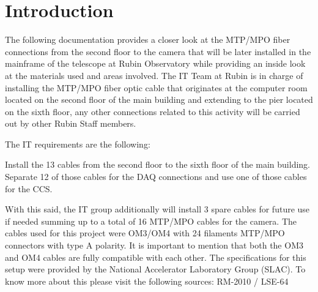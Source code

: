 \section{Introduction}

The following documentation provides a closer look at the MTP/MPO fiber connections from the second floor to the camera that will be later installed in the mainframe of the telescope at Rubin Observatory while providing an inside look at the materials used and areas involved. The IT Team at Rubin is in charge of installing the MTP/MPO fiber optic cable that originates at the computer room located on the second floor of the main building and extending to the pier located on the sixth floor, any other connections related to this activity will be carried out by other Rubin Staff members.



The IT requirements are the following:

Install the 13 cables from the second floor to the sixth floor of the main building.
Separate 12 of those cables for the DAQ connections and use one of those cables for the CCS.


With this said, the IT group additionally will install 3 spare cables for future use if needed summing up to a total of 16 MTP/MPO cables for the camera. The cables used for this project were OM3/OM4 with 24 filaments MTP/MPO connectors with type A polarity. It is important to mention that both the OM3 and OM4 cables are fully compatible with each other. The specifications for this setup were provided by the National Accelerator Laboratory Group (SLAC). To know more about this please visit the following sources: RM-2010 / LSE-64

